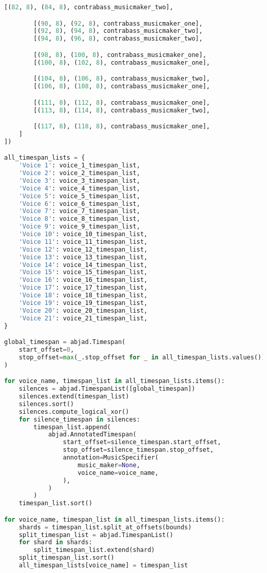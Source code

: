 \begin{lstlisting}[language=Python, caption=Invocation Source Code]
        [(82, 8), (84, 8), contrabass_musicmaker_two],

        [(90, 8), (92, 8), contrabass_musicmaker_one],
        [(92, 8), (94, 8), contrabass_musicmaker_two],
        [(94, 8), (96, 8), contrabass_musicmaker_two],

        [(98, 8), (100, 8), contrabass_musicmaker_one],
        [(100, 8), (102, 8), contrabass_musicmaker_one],

        [(104, 8), (106, 8), contrabass_musicmaker_two],
        [(106, 8), (108, 8), contrabass_musicmaker_one],

        [(111, 8), (112, 8), contrabass_musicmaker_one],
        [(113, 8), (114, 8), contrabass_musicmaker_two],

        [(117, 8), (118, 8), contrabass_musicmaker_one],
    ]
])

all_timespan_lists = {
    'Voice 1': voice_1_timespan_list,
    'Voice 2': voice_2_timespan_list,
    'Voice 3': voice_3_timespan_list,
    'Voice 4': voice_4_timespan_list,
    'Voice 5': voice_5_timespan_list,
    'Voice 6': voice_6_timespan_list,
    'Voice 7': voice_7_timespan_list,
    'Voice 8': voice_8_timespan_list,
    'Voice 9': voice_9_timespan_list,
    'Voice 10': voice_10_timespan_list,
    'Voice 11': voice_11_timespan_list,
    'Voice 12': voice_12_timespan_list,
    'Voice 13': voice_13_timespan_list,
    'Voice 14': voice_14_timespan_list,
    'Voice 15': voice_15_timespan_list,
    'Voice 16': voice_16_timespan_list,
    'Voice 17': voice_17_timespan_list,
    'Voice 18': voice_18_timespan_list,
    'Voice 19': voice_19_timespan_list,
    'Voice 20': voice_20_timespan_list,
    'Voice 21': voice_21_timespan_list,
}

global_timespan = abjad.Timespan(
    start_offset=0,
    stop_offset=max(_.stop_offset for _ in all_timespan_lists.values())
)

for voice_name, timespan_list in all_timespan_lists.items():
    silences = abjad.TimespanList([global_timespan])
    silences.extend(timespan_list)
    silences.sort()
    silences.compute_logical_xor()
    for silence_timespan in silences:
        timespan_list.append(
            abjad.AnnotatedTimespan(
                start_offset=silence_timespan.start_offset,
                stop_offset=silence_timespan.stop_offset,
                annotation=MusicSpecifier(
                    music_maker=None,
                    voice_name=voice_name,
                ),
            )
        )
    timespan_list.sort()

for voice_name, timespan_list in all_timespan_lists.items():
    shards = timespan_list.split_at_offsets(bounds)
    split_timespan_list = abjad.TimespanList()
    for shard in shards:
        split_timespan_list.extend(shard)
    split_timespan_list.sort()
    all_timespan_lists[voice_name] = timespan_list


\end{lstlisting}
